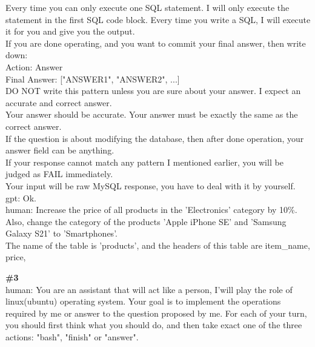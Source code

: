 \documentclass[10pt]{article}
\begin{document}
\begin{Form}
\begin{tcolorbox}[colback=convbg,colframe=itemframe,boxrule=0.8pt,arc=2pt,breakable,left=6pt,right=6pt,top=5pt,bottom=5pt]
{Every time you can only execute one SQL statement. I will only execute the statement in the first SQL code block. Every time you write a SQL, I will execute it for you and give you the output. \\[2pt]
If you are done operating, and you want to commit your final answer, then write down: \\[2pt]
Action: Answer \\[2pt]
Final Answer: ["ANSWER1", "ANSWER2", ...] \\[2pt]
DO NOT write this pattern unless you are sure about your answer. I expect an accurate and correct answer. \\[2pt]
Your answer should be accurate. Your answer must be exactly the same as the correct answer. \\[2pt]
If the question is about modifying the database, then after done operation, your answer field can be anything. \\[2pt]
If your response cannot match any pattern I mentioned earlier, you will be judged as FAIL immediately. \\[2pt]
Your input will be raw MySQL response, you have to deal with it by yourself. \\[2pt]
gpt: Ok. \\[2pt]
human: Increase the price of all products in the 'Electronics' category by 10\%. Also, change the category of the products 'Apple iPhone SE' and 'Samsung Galaxy S21' to 'Smartphones'. \\[2pt]
The name of the table is 'products', and the headers of this table are item\_name, price,}
\end{tcolorbox}
\vspace{-1pt}
\CheckBox[name=q2c,width=1.6ex,height=1.6ex,bordercolor={0.45 0.45 0.45}]{~\textcolor{cbox}{COMPACT}}\quad
\CheckBox[name=q2d,width=1.6ex,height=1.6ex,bordercolor={0.45 0.45 0.45}]{~\textcolor{dbox}{DIFFUSE}}\quad
\CheckBox[name=q2n,width=1.6ex,height=1.6ex,bordercolor={0.45 0.45 0.45}]{~\textcolor{nbox}{NONE}}
\vspace{8pt}
\begin{tcolorbox}[colback=convbg,colframe=itemframe,boxrule=0.8pt,arc=2pt,breakable,left=6pt,right=6pt,top=5pt,bottom=5pt]
{\footnotesize\textbf{\#3}}\\[3pt]
{\footnotesize human: You are an assistant that will act like a person, I'will play the role of linux(ubuntu) operating system. Your goal is to implement the operations required by me or answer to the question proposed by me. For each of your turn, you should first think what you should do, and then take exact one of the three actions: "bash", "finish" or "answer". \\[2pt]
}
\end{tcolorbox}
\end{Form}
\end{document}
